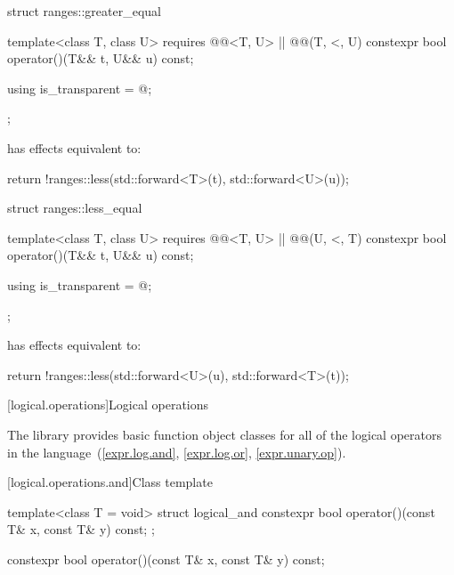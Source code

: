 %
\begin{itemdecl}
struct ranges::greater_equal {
  template<class T, class U>
    requires @@<T, U> || @@(T, <, U)
  constexpr bool operator()(T&& t, U&& u) const;

  using is_transparent = @\unspecnc@;
};
\end{itemdecl}

\begin{itemdescr}
\pnum
{} has effects equivalent to:
\begin{codeblock}
return !ranges::less{}(std::forward<T>(t), std::forward<U>(u));
\end{codeblock}
\end{itemdescr}

%
\begin{itemdecl}
struct ranges::less_equal {
  template<class T, class U>
    requires @@<T, U> || @@(U, <, T)
  constexpr bool operator()(T&& t, U&& u) const;

  using is_transparent = @\unspecnc@;
};
\end{itemdecl}

\begin{itemdescr}
\pnum
{} has effects equivalent to:
\begin{codeblock}
return !ranges::less{}(std::forward<U>(u), std::forward<T>(t));
\end{codeblock}
\end{itemdescr}

[logical.operations]{Logical operations}

\pnum
The library provides basic function object classes for all of the logical
operators in the language~(\ref{expr.log.and}, \ref{expr.log.or}, \ref{expr.unary.op}).

[logical.operations.and]{Class template }

\begin{indexed}{
%
}
\begin{itemdecl}
template<class T = void> struct logical_and {
  constexpr bool operator()(const T& x, const T& y) const;
};
\end{itemdecl}
\end{indexed}

%
\begin{itemdecl}
constexpr bool operator()(const T& x, const T& y) const;
\end{itemdecl}

